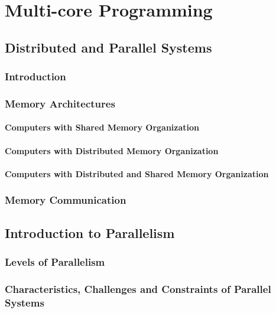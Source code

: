 \chapter{Multi-core Programming}  %
\section{Distributed and Parallel Systems} %
\subsection{Introduction} %
\subsection{Memory Architectures} %
\subsubsection{Computers with Shared Memory Organization}
\subsubsection{Computers with Distributed Memory Organization}
\subsubsection{Computers with Distributed and Shared Memory Organization}
\subsection{Memory Communication} %
\section{Introduction to Parallelism} 
\subsection{Levels of Parallelism}
\subsection{Characteristics, Challenges and Constraints of Parallel Systems} %

